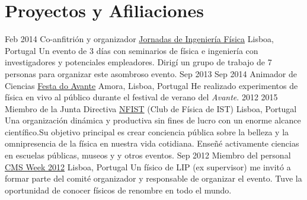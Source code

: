 \documentclass[letterpaper]{twentysecondcv} %
\begin{document}
\section{Proyectos y Afiliaciones}

\begin{twenty}
    \twentyitem
        {Feb 2014}
        {}
        {Co-anfitrión y organizador}
        {\href{http://jornadasdefisica.nfist.pt/index.html}{Jornadas de Ingeniería Física}}
        {Lisboa, Portugal}
        {Un evento de 3 días con seminarios de física e ingeniería con investigadores y potenciales empleadores. Dirigí un grupo de trabajo de 7 personas para organizar este asombroso evento.}
    \twentyitem
        {Sep 2013}
        {Sep 2014}
        {Animador de Ciencias}
        {\href{http://festadoavante.pcp.pt/2016/}{Festa do Avante}}
        {Amora, Lisboa, Portugal}
        {He realizado experimentos de física en vivo al público durante el festival de verano del \emph{Avante}.}
    \twentyitem
        {2012}
        {2015}
        {Miembro de la Junta Directiva}
        {\href{http://nfist.pt}{NFIST} (Club de Física de IST)}
        {Lisboa, Portugal}
        {Una organización dinámica y productiva sin fines de lucro con un enorme alcance científico.Su objetivo principal es crear conciencia pública sobre la belleza y la omnipresencia de la física en nuestra vida cotidiana. Enseñé activamente ciencias en escuelas públicas, museos y y otros eventos.}
    \twentyitem
        {Sep 2012}
        {}
        {Miembro del personal}
        {\href{http://www.lip.pt/cmsweek2012/}{CMS Week 2012}}
        {Lisboa, Portugal}
        {Un físico de LIP (ex supervisor) me invitó a formar parte del comité organizador y responsable de organizar el evento. Tuve la oportunidad de conocer físicos de renombre en todo el mundo.}
\end{twenty}
\end{document}

